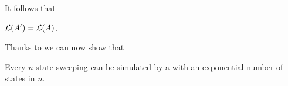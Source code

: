 It follows that
\begin{thrm}\label{thm:swkLAtoNFA}
	$\mathcal L(A')=\mathcal L(A)$.
\end{thrm}

Thanks to  we can now show that
\begin{thrm}
	Every $n$-state sweeping \kDLA can be simulated by a \ONFA with an exponential number of states in $n$.
\end{thrm}
